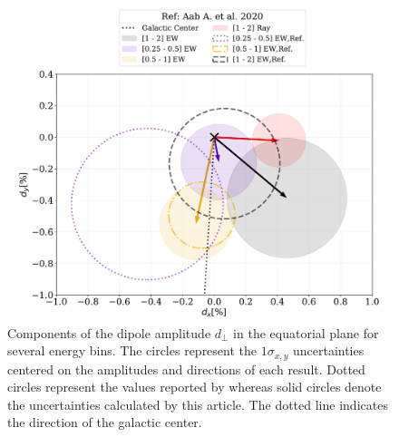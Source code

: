 \documentclass[12pt, doublespace, oneside]{article}
\begin{document}


\begin{figure}[H]
    \begin{small}
        \begin{center}
            \vspace*{-0.21 cm}
            \includegraphics[width=\textwidth]{Figs/comparando_sigmas_v4.pdf}
            \vspace*{-1. cm}
        \end{center}
        \caption{Components of the dipole amplitude $d_\perp$ in the equatorial plane for several energy bins. The circles represent the $1\sigma_{x,y}$ uncertainties centered on the amplitudes and directions of each result. Dotted circles represent the values reported by \cite{Aab_2020} whereas solid circles denote the uncertainties calculated by this article. The dotted line indicates the direction of the galactic center.}
        \label{fig:incertidumbre}
    \end{small}
\end{figure}
\end{document}
